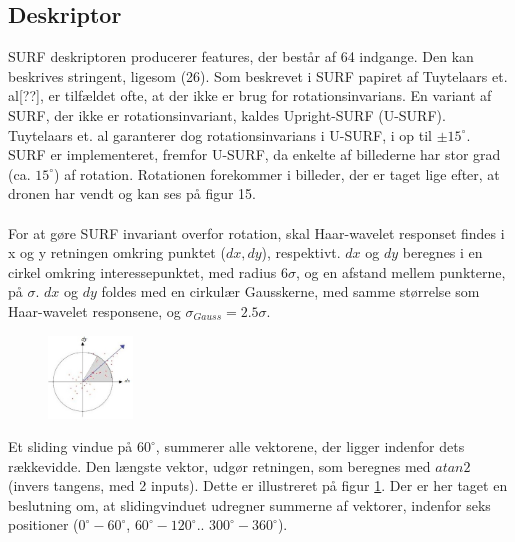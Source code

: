 \subsection{Deskriptor}
SURF deskriptoren producerer features, der består af 64 indgange. Den kan beskrives stringent, ligesom (26). Som beskrevet i SURF papiret af Tuytelaars et. al[??], er tilfældet ofte, at der ikke er brug for rotationsinvarians. En variant af SURF, der ikke er rotationsinvariant, kaldes Upright-SURF (U-SURF). Tuytelaars et. al garanterer dog rotationsinvarians i U-SURF, i op til $\pm 15^{\circ}$. SURF er implementeret, fremfor U-SURF, da enkelte af billederne har stor grad (ca. $15^{\circ}$) af rotation. Rotationen forekommer i billeder, der er taget lige efter, at dronen har vendt og kan ses på figur 15.
\\
\\
For at gøre SURF invariant overfor rotation, skal Haar-wavelet responset findes i x og y retningen omkring punktet ($dx, dy$), respektivt. $dx$ og $dy$ beregnes i en cirkel omkring interessepunktet, med radius $6\sigma$, og en afstand mellem punkterne, på $\sigma$. $dx$ og $dy$ foldes med en cirkulær Gausskerne, med samme størrelse som Haar-wavelet responsene, og $\sigma_{Gauss} = 2.5\sigma$.
\begin{figure}[H]
    \centering
    \includegraphics[width=0.2\textwidth]{fig/surforientation.jpg}
     \vspace{-1em}
    \begin{center}    
       \caption{\textcolor{gray}{\footnotesize \textit{ }}}
    \label{fig:surforientation}
     \end{center}
     \vspace{-2.5em}
  \end{figure} \noindent
Et sliding vindue på $60^{\circ}$, summerer alle vektorene, der ligger indenfor dets rækkevidde. Den længste vektor, udgør retningen, som beregnes med $atan2$ (invers tangens, med 2 inputs). Dette er illustreret på figur \ref{fig:surforientation}. Der er her taget en beslutning om, at slidingvinduet udregner summerne af vektorer, indenfor seks positioner ($0^{\circ}-60^{\circ}$, $60^{\circ}-120^{\circ}$.. $300^{\circ}-360^{\circ}$). 
\\
\\
